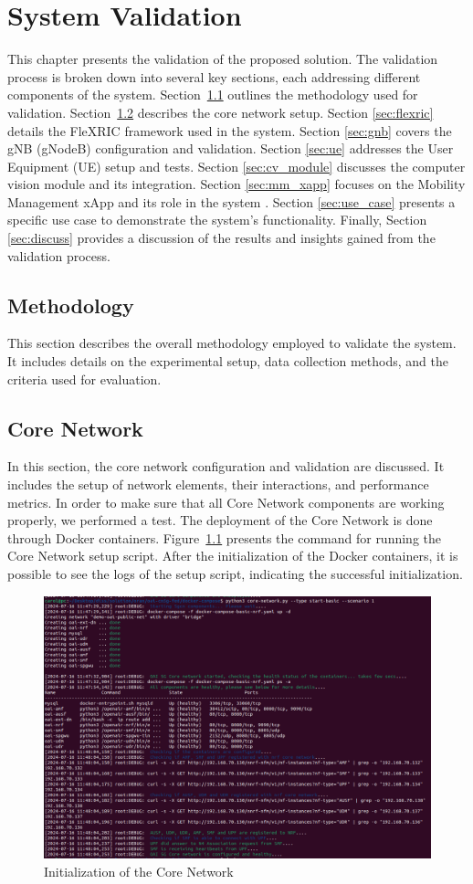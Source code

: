 \chapter{System Validation}\label{ch:validation}

This chapter presents the validation of the proposed solution.
The validation process is broken down into several key sections, each addressing different components of the system.
Section~\ref{sec:meth} outlines the methodology used for validation.
Section~\ref{sec:core_network} describes the core network setup.
Section \ref{sec:flexric} details the FleXRIC framework used in the system.
Section \ref{sec:gnb} covers the gNB (gNodeB) configuration and validation. Section \ref{sec:ue} addresses the User Equipment (UE) setup and tests.
Section \ref{sec:cv_module} discusses the computer vision module and its integration. Section \ref{sec:mm_xapp} focuses on the Mobility Management xApp and its role in the system .
Section \ref{sec:use_case} presents a specific use case to demonstrate the system's functionality.
Finally, Section \ref{sec:discuss} provides a discussion of the results and insights gained from the validation process.

\section{Methodology}\label{sec:meth}
This section describes the overall methodology employed to validate the system. It includes details on the experimental setup, data collection methods, and the criteria used for evaluation.

\section{Core Network}\label{sec:core_network}
In this section, the core network configuration and validation are discussed. It includes the setup of network elements, their interactions, and performance metrics.
In order to make sure that all Core Network components are working properly, we performed a test.
The deployment of the Core Network is done through Docker containers. Figure~\ref{fig:core_init} presents the command for running the Core Network setup script.
After the initialization of the Docker containers, it is possible to see the logs of the setup script, indicating the successful initialization.

\begin{figure}[H]
    \centering
    \includegraphics[width=0.5\linewidth]{figures/core_init}
    \caption[Initialization of the Core Network]{Initialization of the Core Network}
    \label{fig:core_init}
\end{figure}

